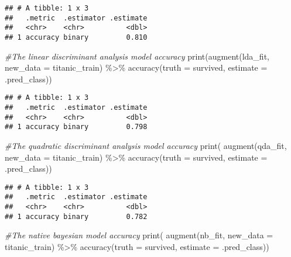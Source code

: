 \documentclass[
]{article}
\newenvironment{Shaded}{\begin{snugshade}}{\end{snugshade}}
\newcommand{\AttributeTok}[1]{\textcolor[rgb]{0.77,0.63,0.00}{#1}}
\newcommand{\CommentTok}[1]{\textcolor[rgb]{0.56,0.35,0.01}{\textit{#1}}}
\newcommand{\FunctionTok}[1]{\textcolor[rgb]{0.00,0.00,0.00}{#1}}
\newcommand{\NormalTok}[1]{#1}
\newcommand{\SpecialCharTok}[1]{\textcolor[rgb]{0.00,0.00,0.00}{#1}}
\begin{document}
\begin{verbatim}
## # A tibble: 1 x 3
##   .metric  .estimator .estimate
##   <chr>    <chr>          <dbl>
## 1 accuracy binary         0.810
\end{verbatim}

\begin{Shaded}
\begin{Highlighting}[]
\CommentTok{\#The linear discriminant analysis model accuracy}
\FunctionTok{print}\NormalTok{(}\FunctionTok{augment}\NormalTok{(lda\_fit, }\AttributeTok{new\_data =}\NormalTok{ titanic\_train) }\SpecialCharTok{\%\textgreater{}\%}
 \FunctionTok{accuracy}\NormalTok{(}\AttributeTok{truth =}\NormalTok{ survived, }\AttributeTok{estimate =}\NormalTok{ .pred\_class))}
\end{Highlighting}
\end{Shaded}

\begin{verbatim}
## # A tibble: 1 x 3
##   .metric  .estimator .estimate
##   <chr>    <chr>          <dbl>
## 1 accuracy binary         0.798
\end{verbatim}

\begin{Shaded}
\begin{Highlighting}[]
\CommentTok{\#The quadratic discriminant analysis model accuracy}
\FunctionTok{print}\NormalTok{( }\FunctionTok{augment}\NormalTok{(qda\_fit, }\AttributeTok{new\_data =}\NormalTok{ titanic\_train) }\SpecialCharTok{\%\textgreater{}\%}
 \FunctionTok{accuracy}\NormalTok{(}\AttributeTok{truth =}\NormalTok{ survived, }\AttributeTok{estimate =}\NormalTok{ .pred\_class))}
\end{Highlighting}
\end{Shaded}

\begin{verbatim}
## # A tibble: 1 x 3
##   .metric  .estimator .estimate
##   <chr>    <chr>          <dbl>
## 1 accuracy binary         0.782
\end{verbatim}

\begin{Shaded}
\begin{Highlighting}[]
\CommentTok{\#The native bayesian model accuracy}
\FunctionTok{print}\NormalTok{( }\FunctionTok{augment}\NormalTok{(nb\_fit, }\AttributeTok{new\_data =}\NormalTok{ titanic\_train) }\SpecialCharTok{\%\textgreater{}\%}
 \FunctionTok{accuracy}\NormalTok{(}\AttributeTok{truth =}\NormalTok{ survived, }\AttributeTok{estimate =}\NormalTok{ .pred\_class))}
\end{Highlighting}
\end{Shaded}
\end{document}
